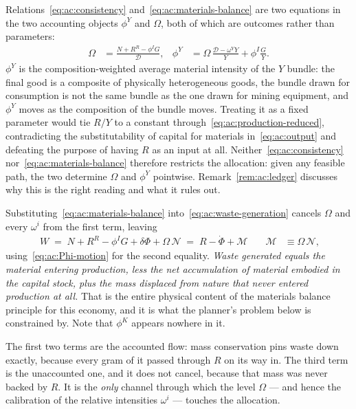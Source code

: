  Relations~\eqref{eq:ac:consistency} and~\eqref{eq:ac:materials-balance} are two equations in the two accounting objects $\phi^Y$ and $\Omega$, both of which are outcomes rather than parameters:
\begin{align}
\Omega &= \frac{N+R^R-\phi^IG}{\mathcal D},
&
\phi^Y &= \Omega\,\frac{\mathcal D-\omega^YY}{Y}+\phi^I\frac{G}{Y}.
\label{eq:ac:Omega}
\end{align}
$\phi^Y$ is the composition-weighted average material intensity of the $Y$ bundle: the final good is a composite of physically heterogeneous goods, the bundle drawn for consumption is not the same bundle as the one drawn for mining equipment, and $\phi^Y$ moves as the composition of the bundle moves. Treating it as a fixed parameter would tie $R/Y$ to a constant through~\eqref{eq:ac:production-reduced}, contradicting the substitutability of capital for materials in~\eqref{eq:ac:output} and defeating the purpose of having $R$ as an input at all. Neither~\eqref{eq:ac:consistency} nor~\eqref{eq:ac:materials-balance} therefore restricts the allocation: given any feasible path, the two determine $\Omega$ and $\phi^Y$ pointwise. Remark~\ref{rem:ac:ledger} discusses why this is the right reading and what it rules out.

 Substituting~\eqref{eq:ac:materials-balance} into~\eqref{eq:ac:waste-generation} cancels $\Omega$ and every $\omega^i$ from the first term, leaving
\begin{align}
\boxed{\;W \;=\; N+R^R-\phi^IG+\delta\Phi+\Omega\,\mathcal N \;=\; R-\dot\Phi+\mathcal M\;}
&&
\mathcal M &\equiv \Omega\,\mathcal N,
\label{eq:ac:ledger}
\end{align}
using~\eqref{eq:ac:Phi-motion} for the second equality. \emph{Waste generated equals the material entering production, less the net accumulation of material embodied in the capital stock, plus the mass displaced from nature that never entered production at all.} That is the entire physical content of the materials balance principle for this economy, and it is what the planner's problem below is constrained by. Note that $\phi^K$ appears nowhere in it.

The first two terms are the accounted flow: mass conservation pins waste down exactly, because every gram of it passed through $R$ on its way in. The third term is the unaccounted one, and it does not cancel, because that mass was never backed by $R$. It is the \emph{only} channel through which the level $\Omega$ --- and hence the calibration of the relative intensities $\omega^i$ --- touches the allocation.


